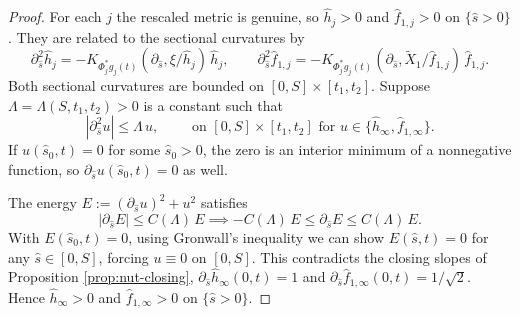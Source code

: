 \documentclass[11pt]{amsart}
\theoremstyle{plain}
\numberwithin{equation}{section}
\theoremstyle{definition}
\theoremstyle{remark}
\begin{document}
\begin{proof}
 For each $j$ the rescaled metric is genuine, so $\hat{h}_j > 0$ and $\hat{f}_{1, j} > 0$ on $\{ \hat{s} > 0 \}$. They are related to the sectional curvatures by
 \[\partial_{\hat{s}}^2 \hat{h}_j = - K_{\Phi_j^*g_j(t)} ( \partial_{\hat{s}}, \xi / \hat{h}_j )\, \hat{h}_j, \qquad\partial_{\hat{s}}^2 \hat{f}_{1, j} = - K_{\Phi_j^*g_j(t)} ( \partial_{\hat{s}}, \widetilde{X}_1 / \hat{f}_{1, j} ) \, \hat{f}_{1, j}.\]
Both sectional curvatures are bounded on $[0,S] \times [t_1,t_2]$. Suppose $\Lambda = \Lambda(S,t_1,t_2) > 0$ is a constant such that 
\[| \partial_{\hat{s}}^2 u | \leq \Lambda \, u, \qquad \text{ on $[ 0, S ] \times [ t_1, t_2 ]$ for $u \in \{ \hat{h}_\infty, \hat{f}_{1, \infty} \}$}.\] If $u ( \hat{s}_0, t ) = 0$ for some $\hat{s}_0 > 0$, the zero is an interior minimum of a nonnegative function, so $\partial_{\hat{s}} u ( \hat{s}_0, t ) = 0$ as well.

The energy $E := ( \partial_{\hat{s}} u )^2 + u^2$ satisfies 
\[| \partial_{\hat{s}} E | \leq C(\Lambda) \, E \implies -C(\Lambda)\,E \leq \partial_{\hat{s}}E \leq C(\Lambda)\,E.\]
With $E ( \hat{s}_0, t ) = 0$, using Gronwall's inequality we can show $E(\hat{s},t) = 0$ for any $\hat{s} \in [0,S]$, forcing $u \equiv 0$ on $[ 0, S ]$. This contradicts the closing slopes of Proposition \ref{prop:nut-closing}, $\partial_{\hat{s}} \hat{h}_\infty ( 0, t ) = 1$ and $\partial_{\hat{s}} \hat{f}_{1, \infty} ( 0, t ) = 1 / \sqrt{2}$. Hence $\hat{h}_\infty > 0$ and $\hat{f}_{1, \infty} > 0$ on $\{ \hat{s} > 0 \}$.
\end{proof}
\end{document}
